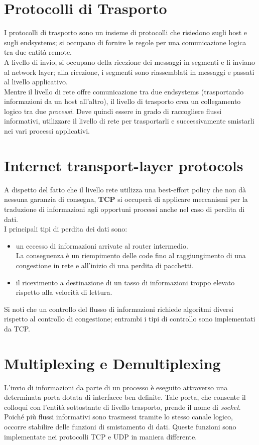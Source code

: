 \section{Protocolli di Trasporto}
I protocolli di trasporto sono un insieme di protocolli che risiedono sugli host e sugli endsystems; si occupano di fornire le regole per una comunicazione logica tra due entità remote.\\
A livello di invio, si occupano della ricezione dei messaggi in segmenti e li inviano al network layer; alla ricezione, i segmenti sono riassemblati in messaggi e passati al livello applicativo.\\
Mentre il livello di rete offre comunicazione tra due endsystems (trasportando informazioni da un host all'altro), il livello di trasporto crea un collegamento logico tra due \textit{processi}. Deve quindi essere in grado di raccogliere flussi informativi, utilizzare il livello di rete per trasportarli e successivamente smistarli nei vari processi applicativi.

\section{Internet transport-layer protocols}
A dispetto del fatto che il livello rete utilizza una best-effort policy che non dà nessuna garanzia di consegna, \textbf{TCP} si occuperà di applicare meccanismi per la traduzione di informazioni agli opportuni processi anche nel caso di perdita di dati.\\
I principali tipi di perdita dei dati sono:
\begin{itemize}
	\item un eccesso di informazioni arrivate al router intermedio. \\
	La conseguenza è un riempimento delle code fino al raggiungimento di una congestione in rete e all'inizio di una perdita di pacchetti.
	\item il ricevimento a destinazione di un tasso di informazioni troppo elevato rispetto alla velocità di lettura. \\
\end{itemize}
Si noti che un controllo del flusso di informazioni richiede algoritmi diversi rispetto al controllo di congestione; entrambi i tipi di controllo sono implementati da TCP.

\section{Multiplexing e Demultiplexing}
L'invio di informazioni da parte di un processo è eseguito attraverso una determinata porta dotata di interfacce ben definite. Tale porta, che consente il colloqui con l'entità sottostante di livello trasporto, prende il nome di \textit{socket}.\\
Poiché più flussi informativi sono trasmessi tramite lo stesso canale logico, occorre stabilire delle funzioni di smistamento di dati. Queste funzioni sono implementate nei protocolli TCP e UDP in maniera differente.\\

